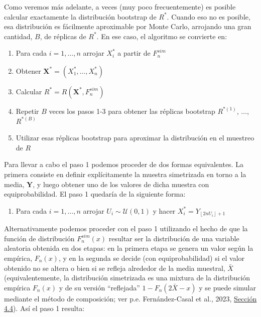 \documentclass[
]{book}
\providecommand{\tightlist}{%
  \setlength{\itemsep}{0pt}\setlength{\parskip}{0pt}}
\renewcommand{\mathbf}[1]{\symbf{#1}}
\theoremstyle{break}
\theoremstyle{nonumberplain}
\begin{document}
Como veremos más adelante, a veces (muy poco frecuentemente) es posible
calcular exactamente la distribución bootstrap de \(R^{\ast}\). Cuando
eso no es posible, esa distribución es fácilmente aproximable por Monte
Carlo, arrojando una gran cantidad, \(B\), de réplicas de \(R^{\ast}\). En
ese caso, el algoritmo se convierte en:

\begin{enumerate}
\def\labelenumi{\arabic{enumi}.}
\item
  Para cada \(i=1,\ldots ,n\) arrojar \(X_i^{\ast}\) a partir de
  \(F_n^{sim}\)
\item
  Obtener \(\mathbf{X}^{\ast}=\left( X_1^{\ast},\ldots
  ,X_n^{\ast} \right)\)
\item
  Calcular
  \(R^{\ast}=R\left( \mathbf{X}^{\ast},F_n^{sim} \right)\)
\item
  Repetir \(B\) veces los pasos 1-3 para obtener las réplicas bootstrap
  \(R^{\ast (1)}\), \(\ldots\), \(R^{\ast (B)}\)
\item
  Utilizar esas réplicas bootstrap para aproximar la distribución en el
  muestreo de \(R\)
\end{enumerate}

Para llevar a cabo el paso 1 podemos proceder de dos formas
equivalentes. La primera consiste en definir explícitamente la muestra
simetrizada en torno a la media, \(\mathbf{Y}\), y luego obtener
uno de los valores de dicha muestra con equiprobabilidad. El paso 1
quedaría de la siguiente forma:

\begin{enumerate}
\def\labelenumi{\arabic{enumi}.}
\tightlist
\item
  Para cada \(i=1,\ldots ,n\) arrojar \(U_i\sim \mathcal{U}\left( 0,1 \right)\) y
  hacer \(X_i^{\ast}=Y_{\left\lfloor 2nU_i\right\rfloor +1}\)
\end{enumerate}

Alternativamente podemos proceder con el paso 1 utilizando el hecho de que la función de distribución \(F_n^{sim}\left( x \right)\) resultar ser la distribución de una variable aleatoria obtenida en dos etapas:
en la primera etapa se genera un valor según la empírica, \(F_n\left( x \right)\), y en la segunda se decide (con equiprobabilidad) si el valor obtenido no se altera o bien si se refleja alrededor de la media muestral, \(\bar{X}\)
(equivalentemente, la distribución simetrizada es una mixtura de la distribución empírica \(F_n\left( x \right)\) y de su versión ``reflejada'' \(1-F_n\left( 2\bar{X}-x \right)\) y se puede simular mediante el método de composición; ver p.e. Fernández-Casal et al., 2023, \href{https://rubenfcasal.github.io/simbook/composicion.html}{Sección 4.4}). Así el paso 1 resulta:
\end{document}
